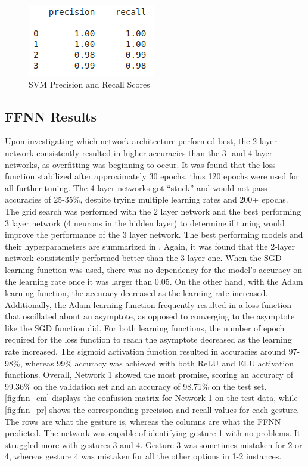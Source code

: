 \documentclass[journal]{IEEEtran}
\begin{document}
\begin{figure}[t]
	\centering
	\includegraphics[width=0.46\linewidth]{SVM_prec_rec}
	\caption{SVM Precision and Recall Scores}
	\label{fig:svm_pr}
\end{figure}

\subsection{FFNN Results}
Upon investigating which network architecture performed best, the 2-layer network consistently resulted in higher accuracies than the 3- and 4-layer networks, as overfitting was beginning to occur. It was found that the loss function stabilized after approximately 30 epochs, thus 120 epochs were used for all further tuning. The 4-layer networks got “stuck” and would not pass accuracies of 25-35\%, despite trying multiple learning rates and 200+ epochs. The grid search was performed with the 2 layer network and the best performing 3 layer network (4 neurons in the hidden layer) to determine if tuning would improve the performance of the 3 layer network. The best performing models and their hyperparameters are summarized in . Again, it was found that the 2-layer network consistently performed better than the 3-layer one. When the SGD learning function was used, there was no dependency for the model’s accuracy on the learning rate once it was larger than 0.05. On the other hand, with the Adam learning function, the accuracy decreased as the learning rate increased. Additionally, the Adam learning function frequently resulted in a loss function that oscillated about an asymptote, as opposed to converging to the asymptote like the SGD function did. For both learning functions, the number of epoch required for the loss function to reach the asymptote decreased as the learning rate increased. The sigmoid activation function resulted in accuracies around 97-98\%, whereas 99\% accuracy was achieved with both ReLU and ELU activation functions. Overall, Network 1 showed the most promise, scoring an accuracy of 99.36\% on the validation set and an accuracy of 98.71\% on the test set. \cref{fig:fnn_cm} displays the confusion matrix for Network 1 on the test data, while \cref{fig:fnn_pr} shows the corresponding precision and recall values for each gesture. The rows are what the gesture is, whereas the columns are what the FFNN predicted. The network was capable of identifying gesture 1 with no problems. It struggled more with gestures 3 and 4. Gesture 3 was sometimes mistaken for 2 or 4, whereas gesture 4 was mistaken for all the other options in 1-2 instances.
\end{document}
